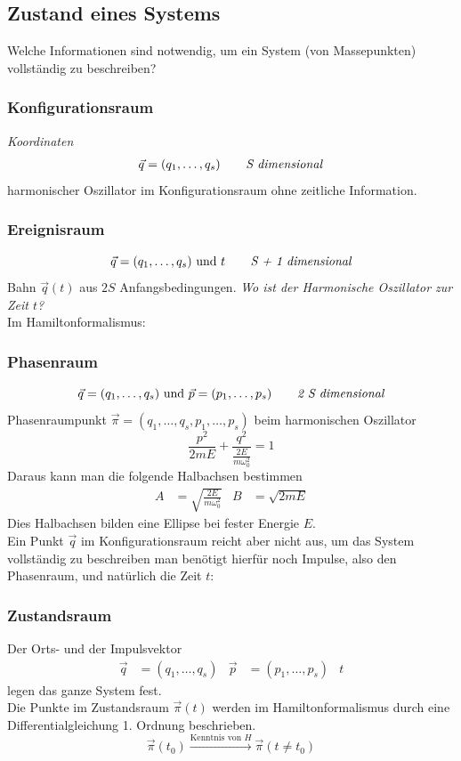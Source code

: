 \subsection{Zustand eines Systems}
Welche Informationen sind notwendig, um ein System (von Massepunkten) vollständig zu beschreiben?
\subsubsection{Konfigurationsraum} \textit{Koordinaten}
\begin{align*}
	\vec{q} = (q_1, \dots, q_s) \text{\textit{\qquad S dimensional}}
\end{align*}
harmonischer Oszillator im Konfigurationsraum ohne zeitliche Information.

\subsubsection{Ereignisraum}
$$\vec{q} = (q_1, \dots, q_s) \text{~und~} t \text{\textit{\qquad S + 1 dimensional}}$$
\conseq Bahn $\vec{q}(t)$ aus $2S$ Anfangsbedingungen. \textit{Wo ist der Harmonische Oszillator zur Zeit $t$?}\\

Im Hamiltonformalismus:

\subsubsection{Phasenraum}
$$\vec{q} = (q_1, \dots, q_s) \text{~und~} \vec{p} = (p_1, \dots, p_s) \text{\textit{\qquad 2 S dimensional}}$$
\conseq Phasenraumpunkt $\vec{\pi} = (q_1, \dots, q_s, p_1, \dots, p_s)$
beim harmonischen Oszillator
$$\frac{p^2}{2 m E} + \frac{q^2}{\frac{2 E}{m \omega_0^2}} = 1$$
Daraus kann man die folgende Halbachsen bestimmen
\begin{align*}
A &= \sqrt{\frac{2 E}{m \omega_0^2}}  &   B &= \sqrt{2 m E}
\end{align*}
Dies Halbachsen bilden eine Ellipse bei fester Energie $E$.\\
Ein Punkt $\vec{q}$ im Konfigurationsraum reicht aber nicht aus, um das System vollständig zu beschreiben man benötigt hierfür noch Impulse, also den Phasenraum, und natürlich die Zeit $t$:

\subsubsection{Zustandsraum}
Der Orts- und der Impulsvektor
\begin{align*}
	\vec{q} &= (q_1, \dots, q_s) & \vec{p} &= (p_1, \dots, p_s) & t
\end{align*}
legen das ganze System fest.\\
Die Punkte im Zustandsraum $\vec{\pi} (t)$ werden im Hamiltonformalismus durch eine Differentialgleichung 1. Ordnung beschrieben.
$$\vec{\pi}(t_0) \xrightarrow{\text{Kenntnis von $H$}} \vec{\pi}(t \neq t_0)$$

